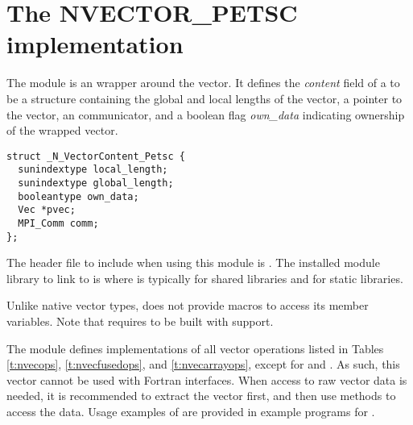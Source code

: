 %
\section{The NVECTOR\_PETSC implementation}\label{ss:nvec_petsc}

The {\nvecpetsc} module is an {\nvector} wrapper around the {\petsc} vector.
It defines the {\em content} field of a  to be a structure containing
the global and local lengths of the vector, a pointer to the {\petsc} vector,
an {\mpi} communicator, and a boolean flag {\em own\_data} indicating ownership of 
the wrapped {\petsc} vector.
\begin{verbatim} 
struct _N_VectorContent_Petsc {
  sunindextype local_length;
  sunindextype global_length;
  booleantype own_data;
  Vec *pvec;
  MPI_Comm comm;
};
\end{verbatim}

The header file to include when using this module is .
The installed module library to link to is
where  is typically  for shared libraries and 
for static libraries.

Unlike native {\sundials} vector types, {\nvecpetsc} does not provide macros 
to access its member variables.
Note that {\nvecpetsc} requires {\sundials} to be built with {\mpi} support.


The {\nvecpetsc} module defines implementations of all vector operations listed 
in Tables \ref{t:nvecops}, \ref{t:nvecfusedops}, and \ref{t:nvecarrayops}, except for
 and . As such, this vector cannot be
used with {\sundials} Fortran interfaces.
When access to raw vector data is needed, it is 
recommended to extract the {\petsc} vector first, and then use {\petsc} 
methods to access the data. Usage examples of {\nvecpetsc} are provided in
example programs for {\ida} \cite{ida_ex}.

